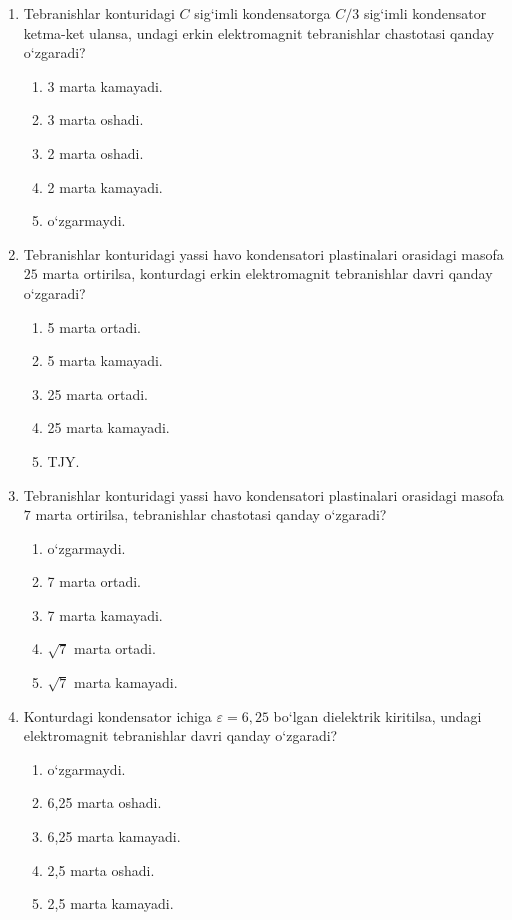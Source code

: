 \begin{enumerate}
\item Tebranishlar konturidagi $C$ sig‘imli kondensatorga $C/3$ sig‘imli kondensator ketma-ket ulansa, undagi erkin elektromagnit tebranishlar chastotasi qanday o‘zgaradi?
\begin{enumerate}[label=\Alph*)]
\item 3 marta kamayadi.
\item 3 marta oshadi.
\item 2 marta oshadi.
\item 2 marta kamayadi.
\item o‘zgarmaydi.
\end{enumerate}

\item Tebranishlar konturidagi yassi havo kondensatori plastinalari orasidagi masofa $25$ marta ortirilsa, konturdagi erkin elektromagnit tebranishlar davri qanday o‘zgaradi?
\begin{enumerate}[label=\Alph*)]
\item 5 marta ortadi.
\item 5 marta kamayadi.
\item 25 marta ortadi.
\item 25 marta kamayadi.
\item TJY.
\end{enumerate}

\item Tebranishlar konturidagi yassi havo kondensatori plastinalari orasidagi masofa $7$ marta ortirilsa, tebranishlar chastotasi qanday o‘zgaradi?
\begin{enumerate}[label=\Alph*)]
\item o‘zgarmaydi.
\item 7 marta ortadi.
\item 7 marta kamayadi.
\item $\sqrt7$ marta ortadi.
\item $\sqrt7$ marta kamayadi.
\end{enumerate}

\item Konturdagi kondensator ichiga $\varepsilon=6,25$ bo‘lgan dielektrik kiritilsa, undagi elektromagnit tebranishlar davri qanday o‘zgaradi?
\begin{enumerate}[label=\Alph*)]
\item o‘zgarmaydi.
\item 6,25 marta oshadi.
\item 6,25 marta kamayadi.
\item 2,5 marta oshadi.
\item 2,5 marta kamayadi.
\end{enumerate}


\end{enumerate}
